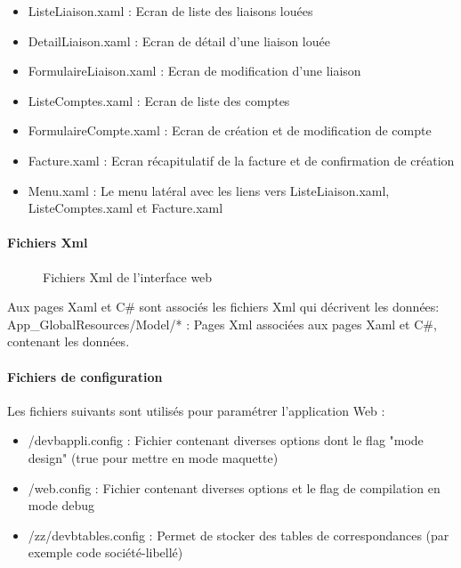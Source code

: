 \documentclass[a4paper,french,12pt]{article}
\begin{document}
					\begin{itemize}
						\item ListeLiaison.xaml : Ecran de liste des liaisons louées
						\item DetailLiaison.xaml : Ecran de détail d’une liaison louée
						\item FormulaireLiaison.xaml : Ecran de modification d'une liaison
						\item ListeComptes.xaml	: Ecran de liste des comptes
						\item FormulaireCompte.xaml	: Ecran de création et de modification de compte
						\item Facture.xaml : Ecran récapitulatif de la facture et de confirmation de création
						\item Menu.xaml	: Le menu latéral avec les liens vers ListeLiaison.xaml, ListeComptes.xaml et Facture.xaml
					\end{itemize}

				\paragraph{Fichiers Xml}
				      \begin{figure}[h!]
					\caption{Fichiers Xml de l'interface web}
					\centering
					\end{figure} 
					Aux pages Xaml et C\# sont associés les fichiers Xml qui décrivent les données: \\
					App\_GlobalResources/Model/* : Pages Xml associées aux pages Xaml et C\#, contenant les données.

				\paragraph{Fichiers de configuration}
% 					
					Les fichiers suivants sont utilisés pour paramétrer l’application Web :
					\begin{itemize}
						\item /devbappli.config : Fichier contenant diverses options dont le flag "mode design" (true pour mettre en mode maquette)
						\item /web.config : Fichier contenant diverses options et le flag de compilation en mode debug
						\item /zz/devbtables.config	: Permet de stocker des tables de correspondances (par exemple code société-libellé)
					\end{itemize}
		
\end{document}
